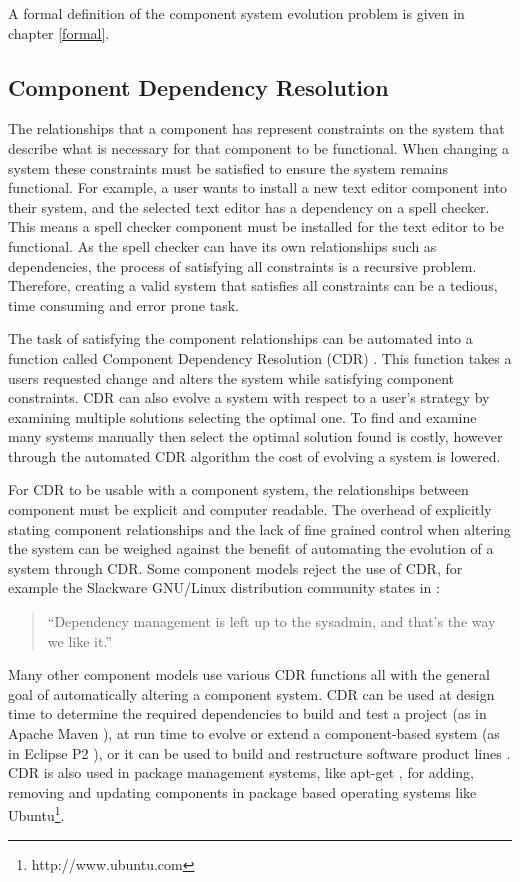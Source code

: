 A formal definition of the component system evolution problem is given in chapter \ref{formal}.

\subsection{Component Dependency Resolution}
The relationships that a component has represent constraints on the system that describe what is necessary for that component to be functional.
When changing a system these constraints must be satisfied to ensure the system remains functional.
For example, a user wants to install a new text editor component into their system, and the selected text editor has a dependency on a spell checker.
This means a spell checker component must be installed for the text editor to be functional.
As the spell checker can have its own relationships such as dependencies, the process of satisfying all constraints is a recursive problem. 
Therefore, creating a valid system that satisfies all constraints can be a tedious, time consuming and error prone task.

The task of satisfying the component relationships can be automated into a function called Component Dependency Resolution (CDR) \cite{Jenson2010}.
This function takes a users requested change and alters the system while satisfying component constraints.
CDR can also evolve a system with respect to a user's strategy by examining multiple solutions selecting the optimal one.
To find and examine many systems manually then select the optimal solution found is costly, however through the automated CDR algorithm the cost of evolving a system is lowered.

For CDR to be usable with a component system, the relationships between component must be explicit and computer readable.
The overhead of explicitly stating component relationships and the lack of fine grained control when altering the system
can be weighed against the benefit of automating the evolution of a system through CDR.
Some component models reject the use of CDR, 
for example the Slackware GNU/Linux distribution community states in \cite{Lumens2000}:
\begin{quote}
``Dependency management is left up to the sysadmin, and that's the way we like it.''
\end{quote}
Many other component models use various CDR functions all with the general goal of automatically altering a component system.
CDR can be used at design time to determine the required dependencies to build and test a project (as in Apache Maven \cite{casey_better_2008}),
at run time to evolve or extend a component-based system (as in Eclipse P2 \cite{leBerre2010}),
or it can be used to build and restructure software product lines \cite{savolainen_analyzing_2007}.
CDR is also used in package management systems, like apt-get \cite{Barth2005},
for adding, removing and updating components in package based operating systems like Ubuntu\footnote{http://www.ubuntu.com}. 

